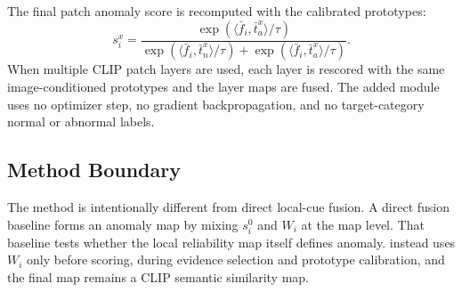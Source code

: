 The final patch anomaly score is recomputed with the calibrated prototypes:
\begin{equation}
  s_i^x =
  \frac{\exp(\langle \bar f_i,\bar t_a^x\rangle/\tau)}
       {\exp(\langle \bar f_i,\bar t_n^x\rangle/\tau)+
        \exp(\langle \bar f_i,\bar t_a^x\rangle/\tau)} .
  \label{eq:final-score}
\end{equation}
When multiple CLIP patch layers are used, each layer is rescored with the same
image-conditioned prototypes and the layer maps are fused. The added module
uses no optimizer step, no gradient backpropagation, and no target-category
normal or abnormal labels.

\subsection{Method Boundary}

The method is intentionally different from direct local-cue fusion. A direct
fusion baseline forms an anomaly map by mixing $s_i^0$ and $W_i$ at the map
level. That baseline tests whether the local reliability map itself defines
anomaly. \method{} instead uses $W_i$ only before scoring, during evidence
selection and prototype calibration, and the final map remains a CLIP semantic
similarity map.
